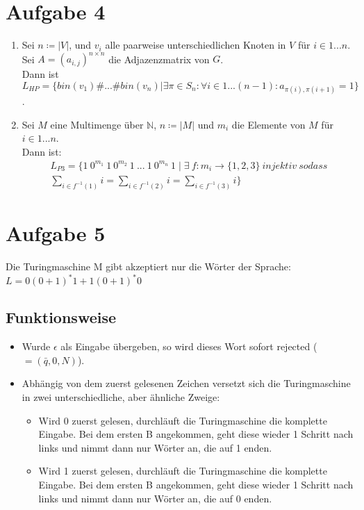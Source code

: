 \documentclass[a4paper,11pt]{scrartcl}
\begin{document}
	\section*{Aufgabe 4}
	\begin{enumerate}[label=\alph*)]
		\item Sei $n \coloneqq \vert V \vert$, und $v_i$ alle paarweise unterschiedlichen Knoten in $V$ für $i \in 1...n$. Sei $A=(a_{i,j})^{n \times n}$ die Adjazenzmatrix von $G$. \\
			  Dann ist $L_{HP} = \{bin(v_1) \# ... \# bin(v_n) \vert  \exists \pi \in S_n : \forall i \in 1...(n-1): a_{\pi (i),\pi (i+1)} = 1\}$.
		\item Sei $M$ eine Multimenge über $\mathbb{N}$, $n \coloneqq \vert M \vert$ und $m_i$ die Elemente von $M$ für $i \in 1...n$. \\
			  Dann ist:
			  \begin{multline*}
			  L_{P3} = \{ 1 \ 0^{m_1} \ 1 \ 0^{m_2} \ 1 \ ... \ 1 \ 0^{m_n} \ 1 \mid \exists \ f: m_i \rightarrow \{1, 2, 3\} \ injektiv \ sodass \\ \sum_{i \in f^{-1}(1)} i = \sum_{i \in f^{-1}(2)} i = \sum_{i \in f^{-1}(3)} i\}
			  \end{multline*}
	\end{enumerate}
	
	
	\section*{Aufgabe 5}
	Die Turingmaschine M gibt akzeptiert nur die Wörter der Sprache: \\
	$L = 0(0+1)^* 1 + 1(0+1)^* 0$
	\subsection*{Funktionsweise}
	\begin{itemize}
	\item Wurde $\epsilon$ als Eingabe übergeben, so wird dieses Wort sofort rejected ($=(\bar{q},0,N)$).
	\item Abhängig von dem zuerst gelesenen Zeichen versetzt sich die Turingmaschine in zwei unterschiedliche, aber ähnliche Zweige:
		\begin{itemize}
		\item Wird 0 zuerst gelesen, durchläuft die Turingmaschine die komplette Eingabe. Bei dem ersten B angekommen, geht diese wieder 1 Schritt nach links und nimmt dann nur Wörter an, die auf 1 enden.
		\item Wird 1 zuerst gelesen, durchläuft die Turingmaschine die komplette Eingabe. Bei dem ersten B angekommen, geht diese wieder 1 Schritt nach links und nimmt dann nur Wörter an, die auf 0 enden.
		\end{itemize}
	\end{itemize}
	
\end{document}
